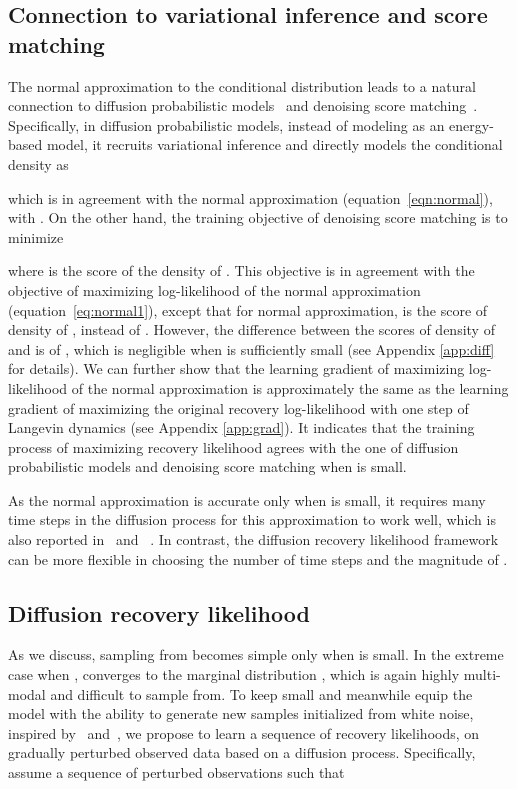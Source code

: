 \documentclass{article} \usepackage{iclr2021_conference,times}
\def\eqref#1{equation~\ref{#1}}
\begin{document}
\subsection{Connection to variational inference and score matching} \label{sect:connection}
The normal approximation to the conditional distribution leads to a natural connection to diffusion probabilistic models~\citep{sohl2015deep,ho2020denoising} and denoising score matching~\citep{vincent2011connection,song2019generative,song2020improved,saremi2018deep,saremi2019neural}. Specifically, in diffusion probabilistic models, instead of modeling  as an energy-based model, it recruits variational inference and directly models the conditional density as

which is in agreement with the normal approximation (\eqref{eqn:normal}), with . On the other hand, the training objective of denoising score matching is to minimize

where  is the score of the density of . This objective is in agreement with the objective of maximizing log-likelihood of the normal approximation (\eqref{eq:normal1}), except that for normal approximation,  is the score of density of , instead of . However, the difference between the scores of density of  and  is of , which is negligible when  is sufficiently small (see Appendix \ref{app:diff} for details). We can further show that the learning gradient of maximizing log-likelihood of the normal approximation is approximately the same as the learning gradient of maximizing the original recovery log-likelihood with one step of Langevin dynamics (see Appendix \ref{app:grad}). It indicates that the training process of maximizing recovery likelihood agrees with the one of diffusion probabilistic models and denoising score matching when  is small. 

As the normal approximation is accurate only when  is small, it requires many time steps in the diffusion process for this approximation to work well, which is also reported in~\citet{ho2020denoising} and ~\citet{song2020improved}. In contrast, the diffusion recovery likelihood framework can be more flexible in choosing the number of time steps and the magnitude of .

\subsection{Diffusion recovery likelihood} \label{sect:seq}
As we discuss, sampling from  becomes simple only when  is small. In the extreme case when ,  converges to the marginal distribution , which is again highly multi-modal and difficult to sample from. To keep  small and meanwhile equip the model with the ability to generate new samples initialized from white noise, inspired by~\citet{sohl2015deep} and~\citet{ho2020denoising}, we propose to learn a sequence of recovery likelihoods, on gradually perturbed observed data based on a diffusion process. Specifically, assume a sequence of perturbed observations  such that 
\end{document}
